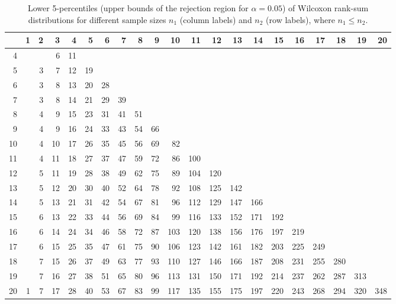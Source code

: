 \begin{table}[ht]
\centering
\begin{tabular}{@{}r@{~~}r@{~~}r@{~~}r@{~~}r@{~~}r@{~~}r@{~~}r@{~~}r@{~~}r@{~~}r@{~~}r@{~~}r@{~~}r@{~~}r@{~~}r@{~~}r@{~~}r@{~~}r@{~~}r@{~~}r@{}}
  \hline
 & 1 & 2 & 3 & 4 & 5 & 6 & 7 & 8 & 9 & 10 & 11 & 12 & 13 & 14 & 15 & 16 & 17 & 18 & 19 & 20 \\ 
  \hline
  4 &  &  & 6 & 11 &  &  &  &  &  &  &  &  &  &  &  &  &  &  &  &  \\ 
  5 &  & 3 & 7 & 12 & 19 &  &  &  &  &  &  &  &  &  &  &  &  &  &  &  \\ 
  6 &  & 3 & 8 & 13 & 20 & 28 &  &  &  &  &  &  &  &  &  &  &  &  &  &  \\ 
  7 &  & 3 & 8 & 14 & 21 & 29 & 39 &  &  &  &  &  &  &  &  &  &  &  &  &  \\ 
  8 &  & 4 & 9 & 15 & 23 & 31 & 41 & 51 &  &  &  &  &  &  &  &  &  &  &  &  \\ 
  9 &  & 4 & 9 & 16 & 24 & 33 & 43 & 54 & 66 &  &  &  &  &  &  &  &  &  &  &  \\ 
  10 &  & 4 & 10 & 17 & 26 & 35 & 45 & 56 & 69 & 82 &  &  &  &  &  &  &  &  &  &  \\ 
  11 &  & 4 & 11 & 18 & 27 & 37 & 47 & 59 & 72 & 86 & 100 &  &  &  &  &  &  &  &  &  \\ 
  12 &  & 5 & 11 & 19 & 28 & 38 & 49 & 62 & 75 & 89 & 104 & 120 &  &  &  &  &  &  &  &  \\ 
  13 &  & 5 & 12 & 20 & 30 & 40 & 52 & 64 & 78 & 92 & 108 & 125 & 142 &  &  &  &  &  &  &  \\ 
  14 &  & 5 & 13 & 21 & 31 & 42 & 54 & 67 & 81 & 96 & 112 & 129 & 147 & 166 &  &  &  &  &  &  \\ 
  15 &  & 6 & 13 & 22 & 33 & 44 & 56 & 69 & 84 & 99 & 116 & 133 & 152 & 171 & 192 &  &  &  &  &  \\ 
  16 &  & 6 & 14 & 24 & 34 & 46 & 58 & 72 & 87 & 103 & 120 & 138 & 156 & 176 & 197 & 219 &  &  &  &  \\ 
  17 &  & 6 & 15 & 25 & 35 & 47 & 61 & 75 & 90 & 106 & 123 & 142 & 161 & 182 & 203 & 225 & 249 &  &  &  \\ 
  18 &  & 7 & 15 & 26 & 37 & 49 & 63 & 77 & 93 & 110 & 127 & 146 & 166 & 187 & 208 & 231 & 255 & 280 &  &  \\ 
  19 &  & 7 & 16 & 27 & 38 & 51 & 65 & 80 & 96 & 113 & 131 & 150 & 171 & 192 & 214 & 237 & 262 & 287 & 313 &  \\ 
  20 & 1 & 7 & 17 & 28 & 40 & 53 & 67 & 83 & 99 & 117 & 135 & 155 & 175 & 197 & 220 & 243 & 268 & 294 & 320 & 348 \\ 
   \hline
\end{tabular}
\caption{Lower 5-percentiles (upper bounds of the rejection region for $\alpha=0.05$) of Wilcoxon rank-sum distributions for different sample sizes $n_1$ (column labels) and $n_2$ (row labels), where ${n_1}\leq{n_2}$.}
\label{tab:w0.05}
\end{table}

